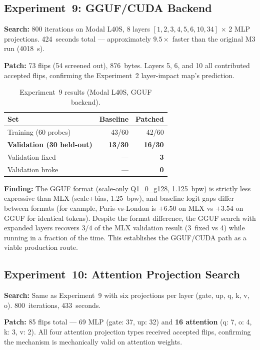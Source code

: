 \documentclass[11pt,a4paper]{article}
\begin{document}
\subsection{Experiment~9: GGUF/CUDA Backend}

\textbf{Search:} 800 iterations on Modal L40S, 8 layers
$[1,2,3,4,5,6,10,34]$ $\times$ 2 MLP projections. 424~seconds total ---
approximately $9.5\times$ faster than the original M3 run (4018~s).

\textbf{Patch:} 73 flips (54 screened out), 876~bytes. Layers 5, 6,
and 10 all contributed accepted flips, confirming the
Experiment~2 layer-impact map's prediction.

\begin{table}[h]
\centering
\caption{Experiment~9 results (Modal L40S, GGUF backend).}
\begin{tabular}{@{}lrr@{}}
\toprule
Set & Baseline & Patched \\
\midrule
Training (60 probes) & 43/60 & 42/60 \\
\textbf{Validation (30 held-out)} & \textbf{13/30} & \textbf{16/30} \\
Validation fixed & --- & \textbf{3} \\
Validation broke & --- & \textbf{0} \\
\bottomrule
\end{tabular}
\end{table}

\textbf{Finding:} The GGUF format (scale-only Q1\_0\_g128, 1.125~bpw)
is strictly less expressive than MLX (scale+bias, 1.25~bpw), and
baseline logit gaps differ between formats (for example, Paris-vs-London
is $+6.50$ on MLX vs $+3.54$ on GGUF for identical tokens). Despite the
format difference, the GGUF search with expanded layers recovers
$3/4$ of the MLX validation result (3~fixed vs 4) while running in a
fraction of the time. This establishes the GGUF/CUDA path as a viable
production route.

\subsection{Experiment~10: Attention Projection Search}

\textbf{Search:} Same as Experiment~9 with six projections per layer
(gate, up, q, k, v, o). 800~iterations, 433~seconds.

\textbf{Patch:} 85 flips total --- 69 MLP (gate: 37, up: 32) and
\textbf{16 attention} (q: 7, o: 4, k: 3, v: 2). All four attention
projection types received accepted flips, confirming the mechanism
is mechanically valid on attention weights.
\end{document}
